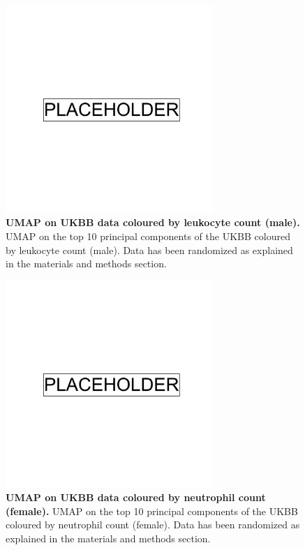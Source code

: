\newpage

\begin{figure}[ht]
    \centering
    \includegraphics[width=0.7\textwidth]{placeholder.png}
    \caption[UMAP on UKBB data coloured by leukocyte count (male)]{\textbf{UMAP on UKBB data coloured by leukocyte count (male).} UMAP on the top 10 principal components of the UKBB coloured by leukocyte count (male). Data has been randomized as explained in the materials and methods section.}
    \label{fig:supp_ukbb_leukocyte_m}
\end{figure}

\newpage

\begin{figure}[ht]
    \centering
    \includegraphics[width=0.7\textwidth]{placeholder.png}
    \caption[UMAP on UKBB data coloured by neutrophil count (female)]{\textbf{UMAP on UKBB data coloured by neutrophil count (female).} UMAP on the top 10 principal components of the UKBB coloured by neutrophil count (female). Data has been randomized as explained in the materials and methods section.}
    \label{fig:supp_ukbb_neutrophill_f}
\end{figure}

